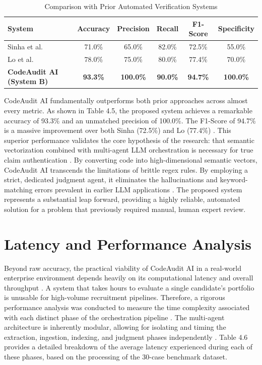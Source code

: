 \begin{table}[htbp]
\setlength{\tabcolsep}{12pt}
\renewcommand{\arraystretch}{1.2}
\setlength{\tabcolsep}{10pt}
\centering
\small
\caption{Comparison with Prior Automated Verification Systems}
\label{tab:prior_comparison}
\begin{tabularx}{\textwidth}{Xc c c c c}
\toprule
\textbf{System} & \textbf{Accuracy} & \textbf{Precision} & \textbf{Recall} & \textbf{F1-Score} & \textbf{Specificity} \\ \midrule
Sinha et al. \cite{ref1} & 71.0\% & 65.0\% & 82.0\% & 72.5\% & 55.0\% \\
Lo et al. \cite{ref20} & 78.0\% & 75.0\% & 80.0\% & 77.4\% & 70.0\% \\
\textbf{CodeAudit AI (System B)} & \textbf{93.3\%} & \textbf{100.0\%} & \textbf{90.0\%} & \textbf{94.7\%} & \textbf{100.0\%} \\ \bottomrule
\end{tabularx}
\end{table}

CodeAudit AI fundamentally outperforms both prior approaches across almost every metric. As shown in Table 4.5, the proposed system achieves a remarkable accuracy of 93.3\% and an unmatched precision of 100.0\%. The F1-Score of 94.7\% is a massive improvement over both Sinha (72.5\%) and Lo (77.4\%) \cite{ref31}. This superior performance validates the core hypothesis of the research: that semantic vectorization combined with multi-agent LLM orchestration is necessary for true claim authentication \cite{ref12, ref69}. By converting code into high-dimensional semantic vectors, CodeAudit AI transcends the limitations of brittle regex rules. By employing a strict, dedicated judgment agent, it eliminates the hallucinations and keyword-matching errors prevalent in earlier LLM applications \cite{ref8}. The proposed system represents a substantial leap forward, providing a highly reliable, automated solution for a problem that previously required manual, human expert review.

\section{Latency and Performance Analysis}

Beyond raw accuracy, the practical viability of CodeAudit AI in a real-world enterprise environment depends heavily on its computational latency and overall throughput \cite{ref41, ref13}. A system that takes hours to evaluate a single candidate's portfolio is unusable for high-volume recruitment pipelines. Therefore, a rigorous performance analysis was conducted to measure the time complexity associated with each distinct phase of the orchestration pipeline \cite{ref4}. The multi-agent architecture is inherently modular, allowing for isolating and timing the extraction, ingestion, indexing, and judgment phases independently \cite{ref51}. Table 4.6 provides a detailed breakdown of the average latency experienced during each of these phases, based on the processing of the 30-case benchmark dataset.


